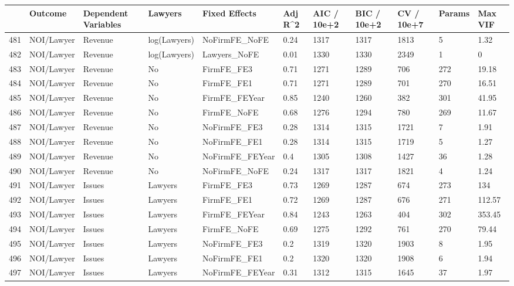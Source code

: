 \documentclass{article}
\begin{document}
\begin{table}[H]
\centering
\begin{tabular}{rllllllllll}
  \hline
 & Outcome & Dependent Variables & Lawyers & Fixed Effects & Adj R^2 & AIC / 10e+2 & BIC / 10e+2 & CV / 10e+7 & Params & Max VIF \\ 
  \hline
481 & NOI/Lawyer & Revenue & log(Lawyers) & NoFirmFE\_NoFE & 0.24 & 1317 & 1317 & 1813 & 5 & 1.32 \\ 
  482 & NOI/Lawyer & Revenue & log(Lawyers) & Lawyers\_NoFE & 0.01 & 1330 & 1330 & 2349 & 1 & 0 \\ 
  483 & NOI/Lawyer & Revenue & No & FirmFE\_FE3 & 0.71 & 1271 & 1289 & 706 & 272 & 19.18 \\ 
  484 & NOI/Lawyer & Revenue & No & FirmFE\_FE1 & 0.71 & 1271 & 1289 & 701 & 270 & 16.51 \\ 
  485 & NOI/Lawyer & Revenue & No & FirmFE\_FEYear & 0.85 & 1240 & 1260 & 382 & 301 & 41.95 \\ 
  486 & NOI/Lawyer & Revenue & No & FirmFE\_NoFE & 0.68 & 1276 & 1294 & 780 & 269 & 11.67 \\ 
  487 & NOI/Lawyer & Revenue & No & NoFirmFE\_FE3 & 0.28 & 1314 & 1315 & 1721 & 7 & 1.91 \\ 
  488 & NOI/Lawyer & Revenue & No & NoFirmFE\_FE1 & 0.28 & 1314 & 1315 & 1719 & 5 & 1.27 \\ 
  489 & NOI/Lawyer & Revenue & No & NoFirmFE\_FEYear & 0.4 & 1305 & 1308 & 1427 & 36 & 1.28 \\ 
  490 & NOI/Lawyer & Revenue & No & NoFirmFE\_NoFE & 0.24 & 1317 & 1317 & 1821 & 4 & 1.24 \\ 
  491 & NOI/Lawyer & Issues & Lawyers & FirmFE\_FE3 & 0.73 & 1269 & 1287 & 674 & 273 & 134 \\ 
  492 & NOI/Lawyer & Issues & Lawyers & FirmFE\_FE1 & 0.72 & 1269 & 1287 & 676 & 271 & 112.57 \\ 
  493 & NOI/Lawyer & Issues & Lawyers & FirmFE\_FEYear & 0.84 & 1243 & 1263 & 404 & 302 & 353.45 \\ 
  494 & NOI/Lawyer & Issues & Lawyers & FirmFE\_NoFE & 0.69 & 1275 & 1292 & 761 & 270 & 79.44 \\ 
  495 & NOI/Lawyer & Issues & Lawyers & NoFirmFE\_FE3 & 0.2 & 1319 & 1320 & 1903 & 8 & 1.95 \\ 
  496 & NOI/Lawyer & Issues & Lawyers & NoFirmFE\_FE1 & 0.2 & 1320 & 1320 & 1908 & 6 & 1.94 \\ 
  497 & NOI/Lawyer & Issues & Lawyers & NoFirmFE\_FEYear & 0.31 & 1312 & 1315 & 1645 & 37 & 1.97 \\ 

\end{tabular}
\end{table}
\end{document}
